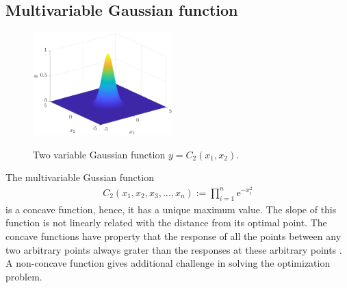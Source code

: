 \documentclass[twocolumn]{svjour3}          %
\newcommand{\me}{\mathrm{e}}
\begin{document}
\subsection{Multivariable Gaussian function}
\begin{figure}
	\centering
	\includegraphics[width=0.48\textwidth]{images/2GussianFunction}
	\label{Fig:TwoVarGaussian}
	\caption{Two variable Gaussian function $y=C_2(x_1, x_2)$.}
\end{figure}
The multivariable Gussian function
\begin{eqnarray}
	C_2(x_1, x_2, x_3, \dots, x_n) := \prod_{i=1}^{n}{\me^{-x_i^2}} \label{Eqn:MultiFactorialNormal}
\end{eqnarray}
is a concave function, hence, it has a unique maximum value. The slope of this function is not linearly related with the distance from its optimal point. The concave functions have property that the response of all the points between any two arbitrary points always grater than the responses at these arbitrary points \cite{antoniou2007practical}. A non-concave function gives additional challenge in solving the optimization problem. 
\end{document}
